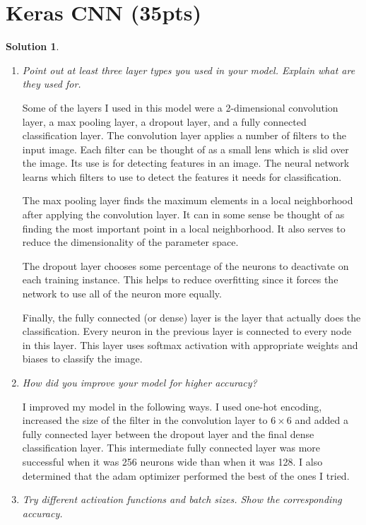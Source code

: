 \documentclass[12pt]{article}
\theoremstyle{definition}
\newtheorem*{solution*}{Solution}
\begin{document}
	\section{Keras CNN (35pts)}
	\begin{solution*}\leavevmode
		\begin{enumerate}[label=\arabic*.,font=\upshape]
			\item \textit{ Point out at least three layer types you used in your model. Explain what are they used for.} 
			
			Some of the layers I used in this model were a 2-dimensional convolution layer, a max pooling layer, a dropout layer, and a fully connected classification layer. The convolution layer applies a number of filters to the input image. Each filter can be thought of as a small lens which is slid over the image. Its use is for detecting features in an image. The neural network learns which filters to use to detect the features it needs for classification.
			
			The max pooling layer finds the maximum elements in a local neighborhood after applying the convolution layer. It can in some sense be thought of as finding the most important point in a local neighborhood. It also serves to reduce the dimensionality of the parameter space. 
			
			The dropout layer chooses some percentage of the neurons to deactivate on each training instance. This helps to reduce overfitting since it forces the network to use all of the neuron more equally. 
			
			Finally, the fully connected (or dense) layer is the layer that actually does the classification. Every neuron in the previous layer is connected to every node in this layer. This layer uses softmax activation with appropriate weights and biases to classify the image. 
			
			\item \textit{ How did you improve your model for higher accuracy?}
			
			I improved my model in the following ways. I used one-hot encoding, increased the size of the filter in the convolution layer to $6\times 6$ and added a fully connected layer between the dropout layer and the final dense classification layer. This intermediate fully connected layer was more successful when it was 256 neurons wide than when it was 128. I also determined that the adam optimizer performed the best of the ones I tried. 
			
			\item \textit{Try different activation functions and batch sizes. Show the corresponding accuracy.}
			

\end{enumerate}
\end{solution*}
\end{document}
